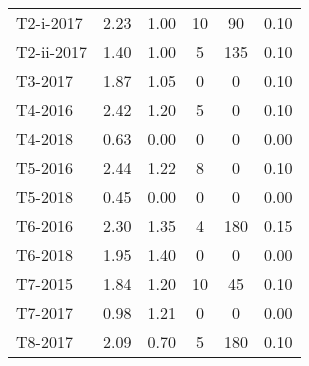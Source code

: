 \begin{tabular}{lccccc}
   T2-i-2017 &                2.23 &            1.00 &                 10 &                        90 &                      0.10 \\
  T2-ii-2017 &                1.40 &            1.00 &                  5 &                       135 &                      0.10 \\
     T3-2017 &                1.87 &            1.05 &                  0 &                         0 &                      0.10 \\
     T4-2016 &                2.42 &            1.20 &                  5 &                         0 &                      0.10 \\
     T4-2018 &                0.63 &            0.00 &                  0 &                         0 &                      0.00 \\
     T5-2016 &                2.44 &            1.22 &                  8 &                         0 &                      0.10 \\
     T5-2018 &                0.45 &            0.00 &                  0 &                         0 &                      0.00 \\
     T6-2016 &                2.30 &            1.35 &                  4 &                       180 &                      0.15 \\
     T6-2018 &                1.95 &            1.40 &                  0 &                         0 &                      0.00 \\
     T7-2015 &                1.84 &            1.20 &                 10 &                        45 &                      0.10 \\
     T7-2017 &                0.98 &            1.21 &                  0 &                         0 &                      0.00 \\
     T8-2017 &                2.09 &            0.70 &                  5 &                       180 &                      0.10 \\
\bottomrule
\end{tabular}
